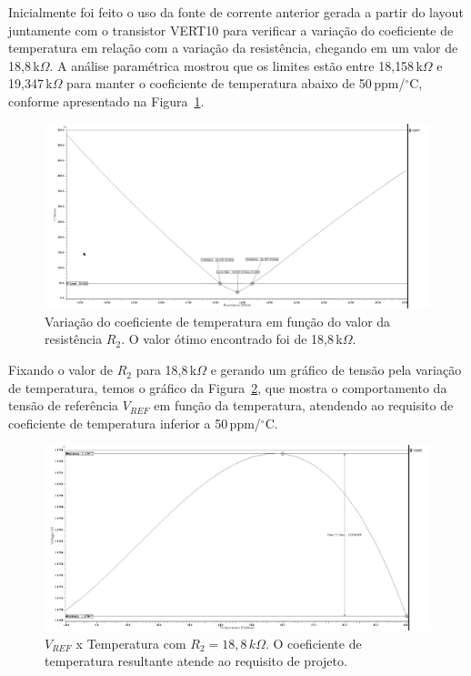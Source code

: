 \documentclass[12pt,a4paper]{article}
\newcommand{\degree}{\ensuremath{{}^\circ}}
\begin{document}
Inicialmente foi feito o uso da fonte de corrente anterior gerada a partir do layout juntamente com o transistor VERT10 para verificar a variação do coeficiente de temperatura em relação com a variação da resistência, chegando em um valor de 18{,}8\,k$\Omega$. A análise paramétrica mostrou que os limites estão entre 18{,}158\,k$\Omega$ e 19{,}347\,k$\Omega$ para manter o coeficiente de temperatura abaixo de 50\,ppm/\degree C, conforme apresentado na Figura~\ref{fig:q25_1}.

\begin{figure}[H]
    \centering
    \includegraphics[width=1\textwidth]{25.1.png}
    \caption{Variação do coeficiente de temperatura em função do valor da resistência $R_2$. O valor ótimo encontrado foi de 18{,}8\,k$\Omega$.}
    \label{fig:q25_1}
\end{figure}

Fixando o valor de $R_2$ para 18{,}8\,k$\Omega$ e gerando um gráfico de tensão pela variação de temperatura, temos o gráfico da Figura~\ref{fig:q25_2}, que mostra o comportamento da tensão de referência $V_{REF}$ em função da temperatura, atendendo ao requisito de coeficiente de temperatura inferior a 50\,ppm/\degree C.

\begin{figure}[H]
    \centering
    \includegraphics[width=1\textwidth]{25.2.png}
    \caption{$V_{REF}$ x Temperatura com $R_2 = 18{,}8\,k\Omega$. O coeficiente de temperatura resultante atende ao requisito de projeto.}
    \label{fig:q25_2}
\end{figure}
\end{document}

